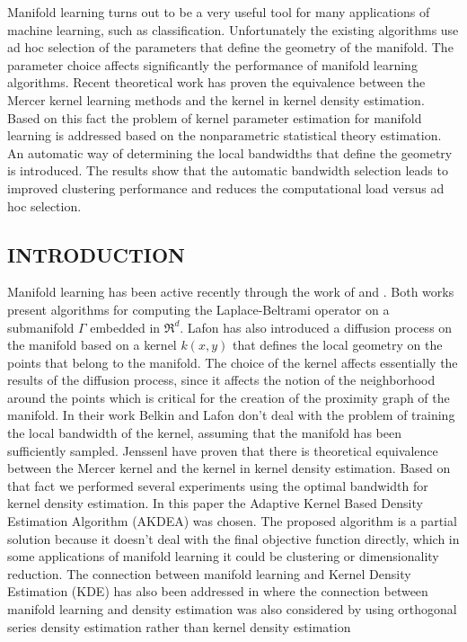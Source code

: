 \documentclass[12pt,letterpaper,doublespaced,ETD,dvips,proposal]{gtthesis}
\begin{document}
\begin{Body}
Manifold learning turns out to be a very useful tool for many
applications of machine learning, such as classification.
Unfortunately the existing algorithms use ad hoc selection of the
parameters that define the geometry of the manifold. The parameter
choice affects significantly the performance of manifold learning
algorithms. Recent theoretical work has proven the equivalence
between the Mercer kernel learning methods and the kernel in kernel
density estimation. Based on this fact the problem of kernel
parameter estimation for manifold learning is addressed based on the
nonparametric statistical theory estimation. An automatic way of
determining the local bandwidths that define the geometry is
introduced. The results show that the automatic bandwidth selection
leads to improved clustering performance and reduces the
computational load versus ad hoc selection.

\subsection{INTRODUCTION}

Manifold learning has been active recently through the work of
\cite{Lafon} and \cite{Belkin}. Both works present algorithms for
computing the Laplace-Beltrami operator on a submanifold $\Gamma$
embedded in $\Re^d$. Lafon has also introduced a diffusion process
on the manifold based on a kernel $k(x,y)$ that defines the local
geometry on the points that belong to the manifold. The choice of
the kernel affects essentially the results of the diffusion process,
since it affects the notion of the neighborhood around the points
which is critical for the creation of the proximity graph of the
manifold. In their work Belkin and Lafon don't deal with the problem
of training the local bandwidth of the kernel, assuming that the
manifold has been sufficiently sampled. Jenssenl \cite{jenssen17lpd}
have proven  that there is theoretical equivalence between the
Mercer kernel and the kernel in kernel density estimation. Based on
that fact we performed several experiments using the optimal
bandwidth for kernel density estimation. In this paper the Adaptive
Kernel Based Density Estimation Algorithm (AKDEA) \cite{Silverman}
was chosen. The proposed algorithm is a partial solution because it
doesn't deal with the final objective function directly, which in
some applications of manifold learning it could be clustering or
dimensionality reduction.
 The connection between manifold
learning and Kernel Density Estimation (KDE) has also been addressed
in \cite{girolami2002osd} where the connection between manifold
learning and density estimation was also considered by using
orthogonal series density estimation rather than kernel density
estimation


\end{Body}
\end{document}
